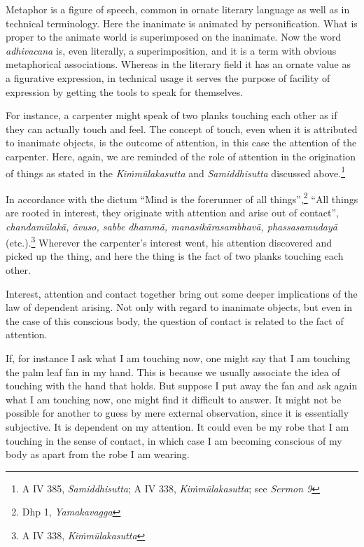 Metaphor is a figure of speech, common in ornate literary language as well as in technical terminology. Here the inanimate is animated by personification. What is proper to the animate world is superimposed on the inanimate. Now the word \emph{adhivacana} is, even literally, a superimposition, and it is a term with obvious metaphorical associations. Whereas in the literary field it has an ornate value as a figurative expression, in technical usage it serves the purpose of facility of expression by getting the tools to speak for themselves.

For instance, a carpenter might speak of two planks touching each other as if they can actually touch and feel. The concept of touch, even when it is attributed to inanimate objects, is the outcome of attention, in this case the attention of the carpenter. Here, again, we are reminded of the role of attention in the origination of things as stated in the \emph{Kiṁmūlakasutta} and \emph{Samiddhisutta} discussed above.\footnote{A IV 385, \emph{Samiddhisutta}; A IV 338, \emph{Kiṁmūlakasutta}; see \emph{Sermon 9}}

In accordance with the dictum ``Mind is the forerunner of all things'',\footnote{Dhp 1, \emph{Yamakavagga}} ``All things are rooted in interest, they originate with attention and arise out of contact'', \emph{chandamūlakā, āvuso, sabbe dhammā, manasikārasambhavā, phassasamudayā} (etc.).\footnote{A IV 338, \emph{Kiṁmūlakasutta}} Wherever the carpenter's interest went, his attention discovered and picked up the thing, and here the thing is the fact of two planks touching each other.

Interest, attention and contact together bring out some deeper implications of the law of dependent arising. Not only with regard to inanimate objects, but even in the case of this conscious body, the question of contact is related to the fact of attention.

If, for instance I ask what I am touching now, one might say that I am touching the palm leaf fan in my hand. This is because we usually associate the idea of touching with the hand that holds. But suppose I put away the fan and ask again what I am touching now, one might find it difficult to answer. It might not be possible for another to guess by mere external observation, since it is essentially subjective. It is dependent on my attention. It could even be my robe that I am touching in the sense of contact, in which case I am becoming conscious of my body as apart from the robe I am wearing.

